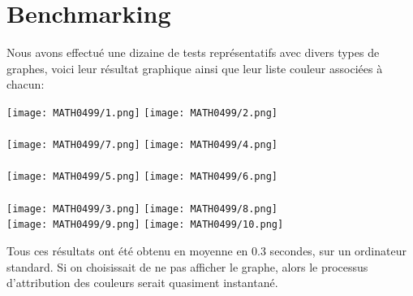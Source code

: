 \documentclass[a4paper, 11pt, oneside]{article}
\begin{document}
\section{Benchmarking}

Nous avons effectué une dizaine de tests représentatifs avec divers types de graphes,
voici leur résultat graphique ainsi que leur liste couleur associées à chacun:

\texttt{[image: MATH0499/1.png]}
\texttt{[image: MATH0499/2.png]}
\\
\\
\texttt{[image: MATH0499/7.png]}
\texttt{[image: MATH0499/4.png]}
\\
\\
\texttt{[image: MATH0499/5.png]}
\texttt{[image: MATH0499/6.png]}
\\
\\
\texttt{[image: MATH0499/3.png]}
\texttt{[image: MATH0499/8.png]}
\\
\texttt{[image: MATH0499/9.png]}
\texttt{[image: MATH0499/10.png]}

Tous ces résultats ont été obtenu en moyenne en 0.3 secondes, sur un ordinateur standard. Si on choisissait de ne pas afficher le graphe, alors le processus d'attribution des couleurs serait quasiment instantané.
\end{document}
